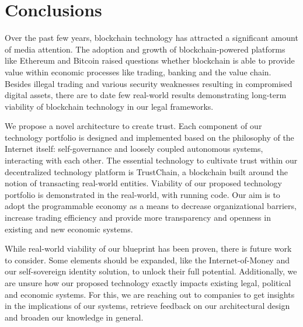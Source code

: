 \documentclass[USenglish]{article}
\begin{document}
\section{Conclusions}

Over the past few years, blockchain technology has attracted a significant amount of media attention.
The adoption and growth of blockchain-powered platforms like Ethereum and Bitcoin raised questions whether blockchain is able to provide value within economic processes like trading, banking and the value chain.
Besides illegal trading and various security weaknesses resulting in compromised digital assets, there are to date few real-world results demonstrating long-term viability of blockchain technology in our legal frameworks.

We propose a novel architecture to create trust.
Each component of our technology portfolio is designed and implemented based on the philosophy of the Internet itself: self-governance and loosely coupled autonomous systems, interacting with each other.
The essential technology to cultivate trust within our decentralized technology platform is TrustChain, a blockchain built around the notion of transacting real-world entities.
Viability of our proposed technology portfolio is demonstrated in the real-world, with running code.
Our aim is to adopt the programmable economy as a means to decrease organizational barriers, increase trading efficiency and provide more transparency and openness in existing and new economic systems.

While real-world viability of our blueprint has been proven, there is future work to consider.
Some elements should be expanded, like the Internet-of-Money and our self-sovereign identity solution, to unlock their full potential.
Additionally, we are unsure how our proposed technology exactly impacts existing legal, political and economic systems.
For this, we are reaching out to companies to get insights in the implications of our systems, retrieve feedback on our architectural design and broaden our knowledge in general.


%

\end{document}
